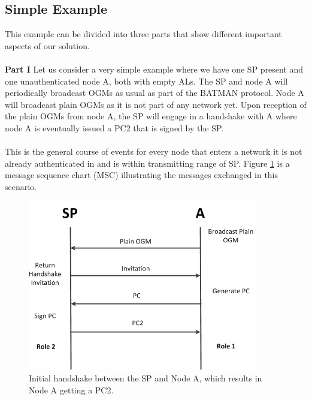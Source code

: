 \subsection{Simple Example} \label{simple_example}
This example can be divided into three parts that show different important aspects of our solution.
\\\\
\textbf{Part I} Let us consider a very simple example where we have one SP present and one unauthenticated node A, both with empty ALs. The SP and node A will periodically broadcast OGMs as usual as part of the BATMAN protocol. Node A will broadcast plain OGMs as it is not part of any network yet. Upon reception of the plain OGMs from node A, the SP will engage in a handshake with A where node A is eventually issued a PC2 that is signed by the SP. %
\\\\
This is the general course of events for every node that enters a network it is not already authenticated in and is within transmitting range of SP. Figure \ref{fig:first_auth_msc} is a message sequence chart (MSC) illustrating the messages exchanged in this scenario.
\\
\begin{figure}[ht]
	\centering
		\includegraphics{images/first_auth_msc.png}
	\caption{Initial handshake between the SP and Node A, which results in Node A getting a PC2.}
	\label{fig:first_auth_msc}
\end{figure}

